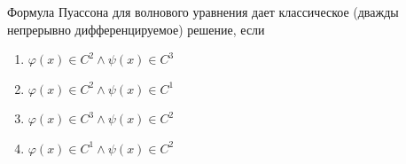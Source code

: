 Формула Пуассона для волнового уравнения дает классическое (дважды непрерывно дифференцируемое) решение, если

\begin{enumerate}[label=\arabic*)]
    \item \(\varphi (x)\in C^2\land \psi (x)\in C^3\)
    \item \(\varphi (x)\in C^2\land \psi (x)\in C^1\)
    \item \(\varphi (x)\in C^3\land \psi (x)\in C^2\)
    \item \(\varphi (x)\in C^1\land \psi (x)\in C^2\)
\end{enumerate}

